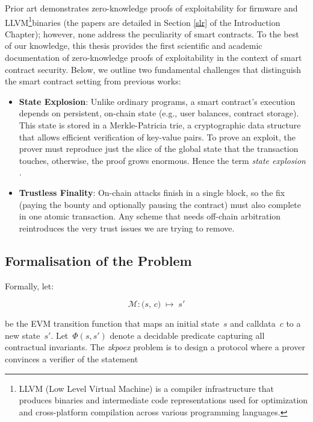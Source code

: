 Prior art demonstrates zero-knowledge proofs of exploitability for firmware\cite{green2023efficient} and LLVM\footnote{LLVM (Low Level Virtual Machine) is a compiler infrastructure that produces binaries and intermediate code representations used for optimization and cross-platform compilation across various programming languages.}binaries\cite{cuellar2023cheesecloth} (the papers are detailed in Section \ref{slr} of the Introduction Chapter); however, none address the peculiarity of smart contracts. To the best of our knowledge, this thesis provides the first scientific and academic documentation of zero-knowledge proofs of exploitability in the context of smart contract security. Below, we outline two fundamental challenges that distinguish the smart contract setting from previous works: 

\begin{itemize}
    \item \textbf{State Explosion}:  Unlike ordinary programs, a smart contract’s execution depends on persistent, on-chain state (e.g., user balances, contract storage). This state is stored in a Merkle-Patricia trie, a cryptographic data structure that allows efficient verification of key-value pairs. To prove an exploit, the prover must reproduce just the slice of the global state that the transaction touches, otherwise, the proof grows enormous. Hence the term \textit{state explosion} \cite{StateExplosion}.
    \item \textbf{Trustless Finality}: On-chain attacks finish in a single block, so the fix (paying the bounty and optionally pausing the contract) must also complete in one atomic transaction. Any scheme that needs off-chain arbitration reintroduces the very trust issues we are trying to remove.
\end{itemize}

\subsection*{Formalisation of the Problem}

Formally, let:

        \begin{equation*}
          \mathcal{M} : \bigl(s,\,c\bigr)\;\mapsto\; s' 
        \end{equation*}
        
be the EVM transition function that maps an initial state~$s$ and calldata~$c$ to a new state~$s'$. Let~$\Phi(s,s')$ denote a decidable predicate capturing all contractual invariants. The \textit{zkpoex} problem is to design a protocol where a prover convinces a verifier of the statement

